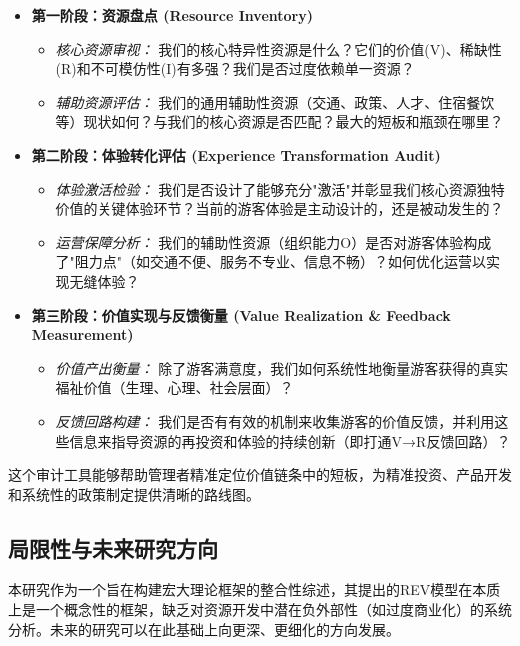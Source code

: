 \documentclass[UTF8, 12pt, a4paper, twoside]{ctexart}
\begin{document}
\begin{itemize}[leftmargin=*, nosep]
	\item \textbf{第一阶段：资源盘点 (Resource Inventory)}
	      \begin{itemize}[label=\textbullet, leftmargin=*]
		      \item \textit{核心资源审视：} 我们的核心特异性资源是什么？它们的价值(V)、稀缺性(R)和不可模仿性(I)有多强？我们是否过度依赖单一资源？
		      \item \textit{辅助资源评估：} 我们的通用辅助性资源（交通、政策、人才、住宿餐饮等）现状如何？与我们的核心资源是否匹配？最大的短板和瓶颈在哪里？
	      \end{itemize}
	\item \textbf{第二阶段：体验转化评估 (Experience Transformation Audit)}
	      \begin{itemize}[label=\textbullet, leftmargin=*]
		      \item \textit{体验激活检验：} 我们是否设计了能够充分"激活"并彰显我们核心资源独特价值的关键体验环节？当前的游客体验是主动设计的，还是被动发生的？
		      \item \textit{运营保障分析：} 我们的辅助性资源（组织能力O）是否对游客体验构成了"阻力点"（如交通不便、服务不专业、信息不畅）？如何优化运营以实现无缝体验？
	      \end{itemize}
	\item \textbf{第三阶段：价值实现与反馈衡量 (Value Realization \& Feedback Measurement)}
	      \begin{itemize}[label=\textbullet, leftmargin=*]
		      \item \textit{价值产出衡量：} 除了游客满意度，我们如何系统性地衡量游客获得的真实福祉价值（生理、心理、社会层面）？
		      \item \textit{反馈回路构建：} 我们是否有有效的机制来收集游客的价值反馈，并利用这些信息来指导资源的再投资和体验的持续创新（即打通V→R反馈回路）？
	      \end{itemize}
\end{itemize}
这个审计工具能够帮助管理者精准定位价值链条中的短板，为精准投资、产品开发和系统性的政策制定提供清晰的路线图。

\subsection{局限性与未来研究方向}
本研究作为一个旨在构建宏大理论框架的整合性综述，其提出的REV模型在本质上是一个概念性的框架，缺乏对资源开发中潜在负外部性（如过度商业化）的系统分析。未来的研究可以在此基础上向更深、更细化的方向发展。
\end{document}
